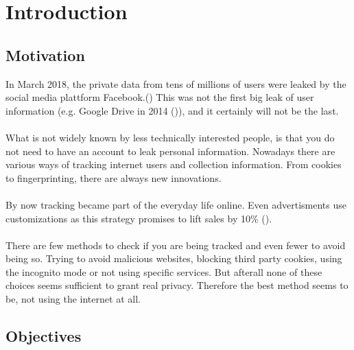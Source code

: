 \chapter{Introduction}
\label{cha:Introduction}

\section{Motivation}
In March 2018, the private data from tens of millions of users were leaked by the social media plattform Facebook.(\textcite{fbScandal}) This was not the first big leak of user information (e.g. Google Drive in 2014 (\textcite{googleDrive})), and it certainly will not be the last.\\\\
What is not widely known by less technically interested people, is that you do not need to have an account to leak personal information. Nowadays there are various ways of tracking internet users and collection information. From cookies to fingerprinting, there are always new innovations.\\\\
By now tracking became part of the everyday life online. Even advertisments use customizations as this strategy promises to lift sales by 10\% (\textcite{ariker15}). \\\\
There are few methods to check if you are being tracked and even fewer to avoid being so. Trying to avoid malicious websites, blocking third party cookies, using the incognito mode or not using specific services. But afterall none of these choices seems sufficient to grant real privacy. Therefore the best method seems to be, not using the internet at all.




\section{Objectives}
